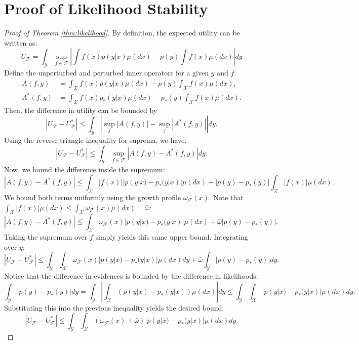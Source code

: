 \documentclass[twoside,11pt]{article}
\begin{document}


\section{Proof of Likelihood Stability}
\label{sec:appendix_likelihood_proof}
\begin{proof}[Proof of Theorem \ref{thm:likelihood}]
    By definition, the expected utility can be written as:
    $$U_{\mathcal{F}} = \int_{\mathcal{Y}} \sup_{f \in \mathcal{F}} \left| \int f(x) p(y|x) \mu(dx) - p(y) \int f(x) \mu(dx) \right| dy$$
    Define the unperturbed and perturbed inner operators for a given $y$ and $f$:
    $$\begin{aligned} A(f, y) &= \int_{\mathcal{X}} f(x)p(y|x)\mu(dx) - p(y) \int_{\mathcal{X}} f(x)\mu(dx), \\ A^*(f, y) &= \int_{\mathcal{X}} f(x)p_*(y|x)\mu(dx) - p_*(y) \int_{\mathcal{X}} f(x)\mu(dx). \end{aligned}$$
    Then, the difference in utility can be bounded by $$|U_{\mathcal{F}} - U_{\mathcal{F}}^*| \le \int_{\mathcal{Y}} \left| \sup_{f} |A(f,y)| - \sup_{f} |A^*(f,y)| \right| dy.$$
    Using the reverse triangle inequality for suprema, we have:
    $$|U_{\mathcal{F}} - U_{\mathcal{F}}^*| \le \int_{\mathcal{Y}} \sup_{f \in \mathcal{F}} |A(f,y) - A^*(f,y)| dy.$$
    Now, we bound the difference inside the supremum:
    $$|A(f, y) - A^*(f, y)| \le \int_{\mathcal{X}} |f(x)| |p(y|x) - p_*(y|x)| \mu(dx) + |p(y) - p_*(y)| \int_{\mathcal{X}} |f(x)| \mu(dx).$$
    We bound both terms uniformly using the growth profile $\omega_{\mathcal{F}}(x)$. Note that $\int_{\mathcal{X}} |f(x)|\mu(dx) \le \int_{\mathcal{X}} \omega_{\mathcal{F}}(x)\mu(dx) = \bar{\omega}$:
    $$|A(f, y) - A^*(f, y)| \le \int_{\mathcal{X}} \omega_{\mathcal{F}}(x) |p(y|x) - p_*(y|x)| \mu(dx) + \bar{\omega} |p(y) - p_*(y)|.$$
    Taking the supremum over $f$ simply yields this same upper bound. Integrating over $y$:
    $$|U_{\mathcal{F}} - U^*_{\mathcal{F}}| \le \int_{\mathcal{Y}} \int_{\mathcal{X}} \omega_{\mathcal{F}}(x) |p(y|x) - p_*(y|x)| \mu(dx) dy + \bar{\omega} \int_{\mathcal{Y}} |p(y) - p_*(y)| dy.$$
    Notice that the difference in evidences is bounded by the difference in likelihoods:
    $$\int_{\mathcal{Y}} |p(y) - p_*(y)| dy = \int_{\mathcal{Y}} \left| \int_{\mathcal{X}} (p(y|x) - p_*(y|x)) \mu(dx) \right| dy \le \int_{\mathcal{Y}} \int_{\mathcal{X}} |p(y|x) - p_*(y|x)| \mu(dx) dy.$$
    Substituting this into the previous inequality yields the desired bound:
    $$|U_{\mathcal{F}} - U^*_{\mathcal{F}}| \le \int_{\mathcal{Y}} \int_{\mathcal{X}} (\omega_{\mathcal{F}}(x) + \bar{\omega}) |p(y|x) - p_*(y|x)| \mu(dx) dy.$$
\end{proof}
\end{document}
